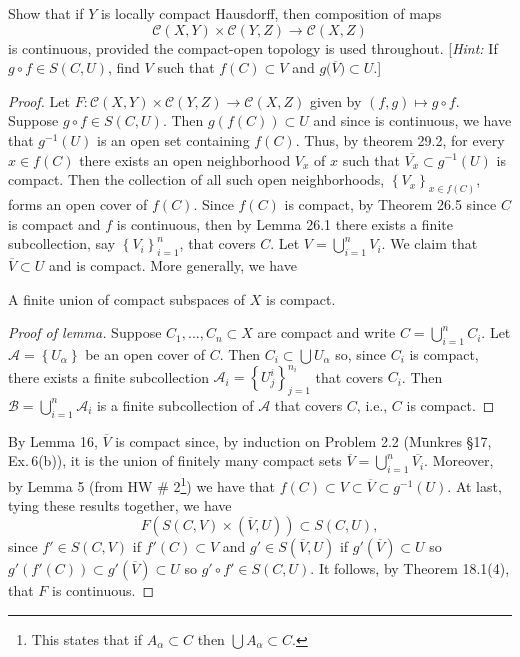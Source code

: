 \newpage
\begin{problem}[Munkres \S 46, Ex.\,7]
Show that if $Y$ is locally compact Hausdorff, then composition
of maps
\[\mathcal{C}(X,Y)\times\mathcal{C}(Y,Z)\longrightarrow\mathcal{C}(X,Z)\]
is continuous, provided the compact-open topology is used
throughout. [\emph{Hint:} If $g\circ f\in S(C,U)$, find $V$ such
that $f(C)\subset V$ and $g\bigl(\overline{V}\bigr)\subset U$.]
\end{problem}
\begin{proof}
Let
$F\colon\mathcal{C}(X,Y)\times\mathcal{C}(Y,Z)\to\mathcal{C}(X,Z)$
given by $(f,g)\mapsto g\circ f$. Suppose $g\circ f\in
S(C,U)$. Then $g(f(C))\subset U$ and since is continuous, we have
that $g^{-1}(U)$ is an open set containing $f(C)$. Thus, by
theorem 29.2, for every $x\in f(C)$ there exists an open
neighborhood $V_x$ of $x$ such that $\overline{V_x}\subset
g^{-1}(U)$ is compact. Then the collection of all such open
neighborhoods, $\left\{V_x\right\}_{x\in f(C)}$, forms an open
cover of $f(C)$. Since $f(C)$ is compact, by Theorem 26.5 since
$C$ is compact and $f$ is continuous, then by Lemma 26.1 there
exists a finite subcollection, say $\left\{V_i\right\}_{i=1}^n$,
that covers $C$. Let $V=\bigcup_{i=1}^n V_i$. We claim that
$\overline{V}\subset U$ and is compact. More generally, we
have
\begin{lemma}[Munkres \S 26, Ex.\,3]
A finite union of compact subspaces of $X$ is compact.
\end{lemma}
\begin{proof}[Proof of lemma]
\renewcommand\qedsymbol{$\clubsuit$}
Suppose $C_1,...,C_n\subset X$ are compact and write
$C=\bigcup_{i=1}^n C_i$. Let
$\mathcal{A}=\left\{U_\alpha\right\}$ be an open cover of
$C$. Then $C_i\subset\bigcup U_\alpha$ so, since $C_i$ is
compact, there exists a finite subcollection
$\mathcal{A}_i=\left\{U_j^i\right\}_{j=1}^{n_i}$ that covers
$C_i$. Then $\mathcal{B}=\bigcup_{i=1}^n\mathcal{A}_i$ is a
finite subcollection of $\mathcal{A}$ that covers $C$, i.e., $C$
is compact.
\end{proof}
By Lemma 16, $\overline{V}$ is compact since, by induction on
Problem 2.2 (Munkres \S 17, Ex.\,6(b)), it is the union of
finitely many compact sets
$\overline{V}=\bigcup_{i=1}^n\overline{V_i}$. Moreover, by Lemma
5 (from HW \# 2\footnote{This states that if $A_\alpha\subset C$
  then $\bigcup   A_\alpha\subset C$.}) we have that
$f(C)\subset V\subset\overline{V}\subset g^{-1}(U)$. At last,
tying these results together, we have
\[
F\left(S(C,V)\times\left(\overline{V},U\right)\right)\subset S(C,U),
\]
since $f'\in S(C,V)$ if $f'(C)\subset V$ and $g'\in
S\left(\overline{V},U\right)$ if
$g'\left(\overline{V}\right)\subset U$ so $g'(f'(C))\subset
g'\left(\overline{V}\right)\subset U$ so $g'\circ f'\in
S(C,U)$. It follows, by Theorem 18.1(4), that $F$ is continuous.
\end{proof}
